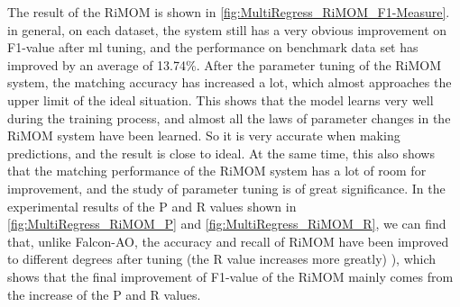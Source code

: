 \documentclass[twoside]{article}
\begin{document}
The result of the RiMOM is shown in \ref{fig:MultiRegress_RiMOM_F1-Measure}. in general, on each dataset, the system still has a very obvious improvement on F1-value after ml tuning, and the performance on benchmark data set has improved by an average of 13.74\%.
After the parameter tuning of the RiMOM system, the matching accuracy has increased a lot, which almost approaches the upper limit of the ideal situation.
This shows that the model learns very well during the training process, and almost all the laws of parameter changes in the RiMOM system have been learned. So it is very accurate when making predictions, and the result is close to ideal.
At the same time, this also shows that the matching performance of the RiMOM system has a lot of room for improvement, and the study of parameter tuning is of great significance.
In the experimental results of the P and R values shown in \ref{fig:MultiRegress_RiMOM_P} and \ref{fig:MultiRegress_RiMOM_R}, we can find that, unlike Falcon-AO, the accuracy and recall of RiMOM have been improved to different degrees after tuning (the R value increases more greatly) ), which shows that the final improvement of F1-value of the RiMOM mainly comes from the increase of the P and R values.

\end{document}
